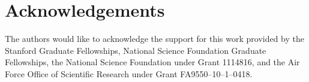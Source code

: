 
\section*{Acknowledgements}

The authors would like to acknowledge the support for this work provided by the Stanford Graduate Fellowships, National Science Foundation Graduate Fellowships, the National Science Foundation under Grant 1114816, and the Air Force Office of Scientific Research under Grant FA9550--10--1--0418.